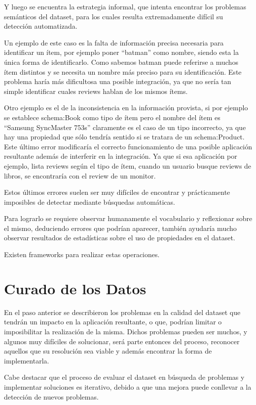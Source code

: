 Y luego se encuentra la estrategia informal, que intenta encontrar los problemas semánticos del dataset, para los cuales resulta extremadamente difícil su detección automatizada.

Un ejemplo de este caso es la falta de información precisa necesaria para identificar un ítem, por ejemplo poner ``batman'' como nombre, siendo esta la única forma de identificarlo. Como sabemos batman puede referirse a muchos ítem distintos y se necesita un nombre más preciso para su identificación.
Este problema haría más dificultosa una posible integración, ya que no sería tan simple identificar cuales reviews hablan de los mismos ítems.

Otro ejemplo es el de la inconsistencia en la información provista, si por ejemplo se establece schema:Book como tipo de ítem pero el nombre del ítem es ``Samsung SyncMaster 753s'' claramente es el caso de un tipo incorrecto, ya que hay una propiedad que sólo tendría sentido si se tratara de un schema:Product.
Este último error modificaría el correcto funcionamiento de una posible aplicación resultante además de interferir en la integración. Ya que si esa aplicación por ejemplo, lista reviews según el tipo de ítem, cuando un usuario busque reviews de libros, se encontraría con el review de un monitor.

Estos últimos errores suelen ser muy difíciles de encontrar y prácticamente imposibles de detectar mediante búsquedas automáticas.

Para lograrlo se requiere observar humanamente el vocabulario y reflexionar sobre el mismo, deduciendo errores que podrían aparecer, también ayudaría mucho observar resultados de estadísticas sobre el uso de propiedades en el dataset.

Existen frameworks para realizar estas operaciones.

%
\section{Curado de los Datos}

En el paso anterior se describieron los problemas en la calidad del dataset que tendrán un impacto en la aplicación resultante, 
o que, podrían limitar o imposibilitar la realización de la misma. Dichos problemas pueden ser muchos, y algunos muy difíciles
de solucionar, será parte entonces del proceso, reconocer aquellos que su resolución sea viable y además encontrar la forma de 
implementarla.

Cabe destacar que el proceso de evaluar el dataset en búsqueda de problemas y implementar soluciones es iterativo, debido a que 
una mejora puede conllevar a la detección de nuevos problemas.

